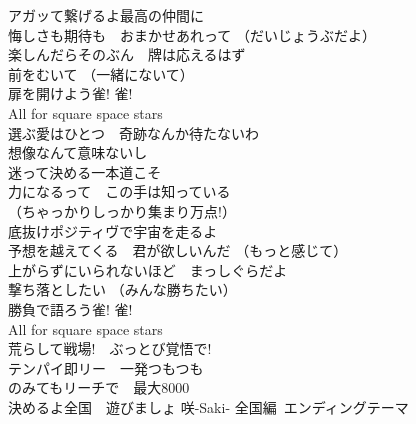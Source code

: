 {アガッて繋げるよ最高の仲間に\\
悔しさも期待も　おまかせあれって （だいじょうぶだよ）\\
楽しんだらそのぶん　牌は応えるはず\\
前をむいて （一緒にないて）\\
扉を開けよう雀! 雀!\\
All for square space stars\\

選ぶ愛はひとつ　奇跡なんか待たないわ\\
想像なんて意味ないし\\
迷って決める一本道こそ\\
力になるって　この手は知っている\\
（ちゃっかりしっかり集まり万点!）\\

底抜けポジティヴで宇宙を走るよ\\
予想を越えてくる　君が欲しいんだ （もっと感じて）\\
上がらずにいられないほど　まっしぐらだよ\\
撃ち落としたい （みんな勝ちたい）\\
勝負で語ろう雀! 雀!\\
All for square space stars\\

荒らして戦場!　ぶっとび覚悟で!\\
テンパイ即リー　一発つもつも\\
のみてもリーチで　最大8000\\
決めるよ全国　遊びましょ
}
{咲-Saki- 全国編~エンディングテーマ}
